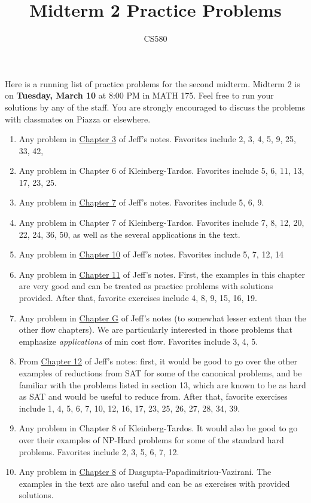 \documentclass{article}
\title{Midterm 2 Practice Problems}
\author{CS580}
\begin{document}
\maketitle

Here is a running list of practice problems for the second midterm. Midterm 2 is on \textbf{Tuesday, March 10} at 8:00 PM in MATH 175. Feel free to run your solutions by any of the staff. You are strongly encouraged to discuss the problems with classmates on Piazza or elsewhere.

\begin{enumerate}
    \item Any problem in \href{http://jeffe.cs.illinois.edu/teaching/algorithms/book/03-dynprog.pdf}{Chapter 3} of Jeff's notes. Favorites include 2, 3, 4, 5, 9, 25, 33, 42,
    \item Any problem in Chapter 6 of Kleinberg-Tardos. Favorites include 5, 6, 11, 13, 17, 23, 25.
    \item Any problem in
    \href{http://jeffe.cs.illinois.edu/teaching/algorithms/book/07-mst.pdf}{Chapter 7} of Jeff's notes. Favorites include 5, 6, 9.
    \item Any problem in Chapter 7 of Kleinberg-Tardos. Favorites include 7, 8, 12, 20, 22, 24, 36, 50, as well as the several applications in the text.
    \item Any problem in \href{http://jeffe.cs.illinois.edu/teaching/algorithms/book/10-maxflow.pdf}{Chapter 10} of Jeff's notes. Favorites include 5, 7, 12, 14
    \item Any problem in
    \href{http://jeffe.cs.illinois.edu/teaching/algorithms/book/11-maxflowapps.pdf}{Chapter 11} of Jeff's notes. First, the examples in this chapter are very good and can be treated as practice problems with solutions provided. After that, favorite exercises include 4, 8, 9, 15, 16, 19.
    \item Any problem in \href{http://jeffe.cs.illinois.edu/teaching/algorithms/notes/G-mincostflow.pdf}{Chapter G} of Jeff's notes (to somewhat lesser extent than the other flow chapters).  We are particularly interested in those problems that emphasize \emph{applications} of min cost flow. Favorites include 3, 4, 5. 
    \item From \href{http://jeffe.cs.illinois.edu/teaching/algorithms/book/12-nphard.pdf}{Chapter 12} of Jeff's notes: first, it would be good to go over the other examples of reductions from SAT for some of the canonical problems, and be familiar with the problems listed in section 13, which are known to be as hard as SAT and would be useful to reduce from. After that, favorite exercises include 1, 4, 5, 6, 7, 10, 12, 16, 17, 23, 25, 26, 27, 28, 34, 39.
    \item Any problem in Chapter 8 of Kleinberg-Tardos. It would also be good to go over their examples of NP-Hard problems for some of the standard hard problems. Favorites include 2, 3, 5, 6, 7, 12.
    \item Any problem in \href{https://people.eecs.berkeley.edu/~vazirani/algorithms/chap8.pdf}{Chapter 8} of Dasgupta-Papadimitriou-Vazirani. The examples in the text are also useful and can be as exercises with provided solutions.
\end{enumerate}
\end{document}
